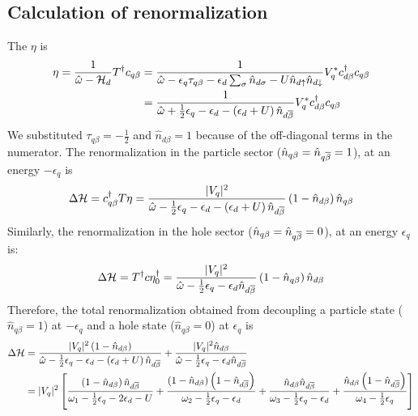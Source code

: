 \documentclass[12pt,twoside]{article}
\numberwithin{equation}{section}
\begin{document}
\subsection{Calculation of renormalization}
The \(\eta\) is
\begin{equation}\begin{aligned}
	\eta = \frac{1}{\hat \omega - \mathcal{H}_d}T^\dagger c_{q\beta} &= \frac{1}{\hat \omega - \epsilon_q \tau_{q\beta} - \epsilon_{d}\sum_\sigma  \hat n_{d\sigma} -  U \hat n_{d\uparrow} \hat n_{d\downarrow}}V_q^* c^\dagger_{d\beta}c_{q\beta}\\
							     &= \frac{1}{\hat \omega + \frac{1}{2}\epsilon_q - \epsilon_d - \left(\epsilon_d + U \right)\hat n_{d\overline\beta}}V_q^* c^\dagger_{d\beta}c_{q\beta}
\end{aligned}\end{equation}
We substituted \(\tau_{q\beta} = -\frac{1}{2}\) and \(\hat n_{d\beta} = 1\) because of the off-diagonal terms in the numerator.
The renormalization in the particle sector (\(\hat n_{q\beta} = \hat n_{q\overline\beta} = 1\)), at an energy \(-\epsilon_q\) is
\begin{equation}\begin{aligned}
\Delta \mathcal{H} = c^\dagger_{q\beta} T \eta= \frac{|V_q|^2}{\hat \omega - \frac{1}{2}\epsilon_q - \epsilon_d - \left(\epsilon_d + U \right)\hat n_{d\overline\beta}} \left(1 - \hat n_{d\beta}\right)\hat n_{q\beta} 
\end{aligned}\end{equation}
Similarly, the renormalization in the hole sector (\(\hat n_{q\beta} = \hat n_{q\overline\beta} = 0\)), at an energy \(\epsilon_q\) is:
\begin{equation}
	\Delta \mathcal{H} = T^\dagger c \eta_0^\dagger = \frac{|V_q|^2}{\hat \omega - \frac{1}{2}\epsilon_q - \epsilon_d\hat n_{d\overline\beta}}\left(1 - \hat n_{q\beta}\right)\hat n_{d\beta}
\end{equation}
Therefore, the total renormalization obtained from decoupling a particle state (\(\hat n_{q\beta}=1\)) at \(-\epsilon_q\) and a hole state (\(\hat n_{q\beta}=0\)) at \(\epsilon_q\) is
\begin{equation}\begin{aligned}
	\Delta \mathcal{H} &= \frac{|V_q|^2 \left(1 - \hat n_{d\beta}\right)}{\hat \omega - \frac{1}{2}\epsilon_q - \epsilon_d - \left(\epsilon_d + U \right)\hat n_{d\overline\beta}} + \frac{|V_q|^2\hat n_{d\beta}}{\hat \omega - \frac{1}{2}\epsilon_q - \epsilon_d \hat n_{d\overline\beta}}\\
		    &=|V_q|^2 \left[\frac{\left(1 - \hat n_{d\beta}\right)\hat n_{d\overline\beta}}{\omega_1 - \frac{1}{2}\epsilon_q - 2\epsilon_d - U} + \frac{\left(1 - \hat n_{d\beta}\right)\left( 1-\hat n_{d\overline\beta} \right)}{\omega_2 - \frac{1}{2}\epsilon_q - \epsilon_d} + \frac{\hat n_{d\beta} \hat n_{d\overline\beta}}{\omega_3 - \frac{1}{2}\epsilon_q - \epsilon_d} + \frac{\hat n_{d\beta}\left( 1- \hat n_{d\overline\beta}\right) }{\omega_4 - \frac{1}{2}\epsilon_q}\right]\\
\end{aligned}\end{equation}
\end{document}

